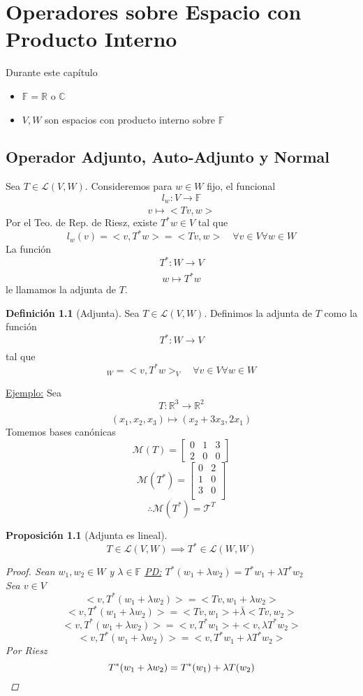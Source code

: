 \documentclass[11pt]{book}
\newcommand{\set}[1]{\mathbb{#1}}
\newcommand{\func}[5]{#1:#2\xrightarrow[#5]{#4}#3}
\newtheorem{prop}[thm]{Proposición}
\theoremstyle{definition}
\newtheorem{defn}{Definición}[section]
\begin{document}
\chapter{Operadores sobre Espacio con Producto Interno}
Durante este capítulo
\begin{itemize}
	\item $\set{F}=\set{R}$ o $\set{C}$

	\item $V,W$ son espacios con producto interno sobre $\set{F}$
\end{itemize}
\section{Operador Adjunto, Auto-Adjunto y Normal}
Sea $T\in\mathcal{L}(V,W)$. Consideremos para $w\in W$ fijo, el funcional
\[\func{l_w}{V}{\set{F}}{}{}\]
\[v\mapsto <Tv,w>\]
Por el Teo. de Rep. de Riesz, existe $T^*w\in V$ tal que
\[l_w(v)=<v,T^*w>=<Tv,w>\quad\forall v\in V\forall w\in W\]
La función
\[\func{T^*}{W}{V}{}{}\]
\[w\mapsto T^*w\]
le llamamos la adjunta de $T$.
\begin{defn}[Adjunta]
	Sea $T\in\mathcal{L}(V,W)$. Definimos la adjunta de $T$ como la función
	\[\func{T^*}{W}{V}{}{}\]
	tal que
	\[<Tv,w>_W=<v,T^* w>_V\quad\forall v\in V\forall w\in W\]
\end{defn}
\underline{Ejemplo:} Sea
\[\func{T}{\set{R}^3}{\set{R}^2}{}{}\]
\[(x_1,x_2,x_3)\mapsto (x_2+3x_3,2x_1)\]
Tomemos bases canónicas
\[\mathcal{M}(T)=\begin{bmatrix}
		0 & 1 & 3 \\
		2 & 0 & 0
	\end{bmatrix}\]
\[\mathcal{M}(T^*)=\begin{bmatrix}
		0 & 2 \\
		1 & 0 \\
		3 & 0 \\
	\end{bmatrix}\]
\[\therefore \mathcal{M}(T^*)=\mathcal{T}^T\]
\begin{prop}[Adjunta es lineal]
	\[T\in\mathcal{L}(V,W)\implies T^*\in\mathcal{L}(W,W)\]
	\begin{proof}
		Sean $w_1,w_2\in W$ y $\lambda\in\set{F}$
		\underline{PD:} $T^*(w_1+\lambda w_2)=T^*w_1+\lambda T^*w_2$\\
		Sea $v\in V$
		\[<v,T^*(w_1+\lambda w_2)>=<Tv,w_1+\lambda w_2>\]
		\[<v,T^*(w_1+\lambda w_2)>=<Tv,w_1>+\bar{\lambda}<Tv,w_2>\]
		\[<v,T^*(w_1+\lambda w_2)>=<v,T^*w_1>+<v,\lambda T^*w_2>\]
		\[<v,T^*(w_1+\lambda w_2)>=<v,T^*w_1+\lambda T^*w_2>\]
		Por Riesz
		\[T^*(w_1+\lambda w_2)=T^*(w_1)+\lambda T(w_2)\qedhere\]
	\end{proof}
\end{prop}
\end{document}
